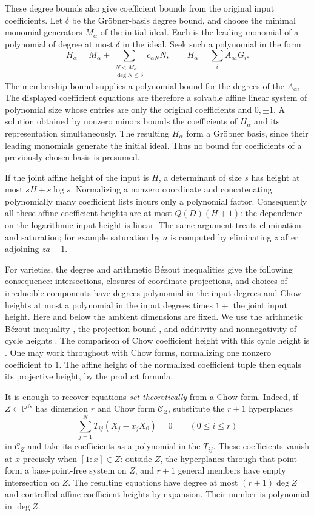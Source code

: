 These degree bounds also give coefficient bounds from the original
input coefficients.  Let $\delta$ be the Gr\"obner-basis degree bound,
and choose the minimal monomial generators $M_\alpha$ of the initial
ideal.  Each is the leading monomial of a polynomial of degree at most
$\delta$ in the ideal.  Seek such a polynomial in the form
\[
 H_\alpha=M_\alpha+
 \sum_{\substack{N<M_\alpha\\\deg N\leq\delta}}c_{\alpha N}N,
 \qquad H_\alpha=\sum_i A_{\alpha i}G_i.
\]
The membership bound supplies a polynomial bound for the degrees of
the $A_{\alpha i}$.  The displayed coefficient equations are therefore
a solvable affine linear system of polynomial size whose entries are
only the original coefficients and $0,\pm1$.  A solution obtained by
nonzero minors bounds the coefficients of $H_\alpha$ and its
representation simultaneously.  The resulting $H_\alpha$ form a
Gr\"obner basis, since their leading monomials generate the initial
ideal.  Thus no bound for coefficients of a previously chosen basis
is presumed.

If the joint affine height of the input is $H$, a determinant of size
$s$ has height at most $sH+s\log s$.  Normalizing a nonzero coordinate
and concatenating polynomially many coefficient lists incurs only a
polynomial factor.  Consequently all these affine coefficient heights
are at most $Q(D)(H+1)$: the dependence on the logarithmic input height
is linear.  The same argument treats elimination and saturation; for
example saturation by $a$ is computed by eliminating $z$ after
adjoining $za-1$.

For varieties, the degree and arithmetic B\'ezout inequalities give the
following consequence: intersections, closures of coordinate projections,
and choices of irreducible components have degrees polynomial in the
input degrees and Chow heights at most a polynomial in the input degrees times $1+$
the joint input height.  Here and below the ambient dimensions are fixed.
We use the arithmetic B\'ezout inequality
\cite[Corollary~2.11]{KPS2001}, the projection bound
\cite[Lemma~2.6]{KPS2001}, and additivity and nonnegativity of cycle
heights \cite[Section~1.2.4]{KPS2001}.  The comparison of Chow
coefficient height with this cycle height is
\cite[Lemma~1.1, inequality~(1.2), and Section~1.2.4]{KPS2001}.
One may work throughout with Chow forms, normalizing one nonzero
coefficient to $1$.  The affine height of the normalized coefficient
tuple then equals its projective height, by the product formula.

It is enough to recover equations \emph{set-theoretically} from a Chow
form.  Indeed, if $Z\subset\mathbb P^N$ has dimension $r$ and Chow form
$\mathcal C_Z$, substitute the $r+1$ hyperplanes
\[
 \sum_{j=1}^N T_{ij}(X_j-x_jX_0)=0\qquad(0\leq i\leq r)
\]
in $\mathcal C_Z$ and take its coefficients as a polynomial in the
$T_{ij}$.  These coefficients vanish at $x$ precisely when
$[1:x]\in Z$: outside $Z$, the hyperplanes through that point form a
base-point-free system on $Z$, and $r+1$ general members have empty
intersection on $Z$.  The resulting equations have degree at most
$(r+1)\deg Z$ and controlled affine coefficient heights by expansion.
Their number is polynomial in $\deg Z$.

